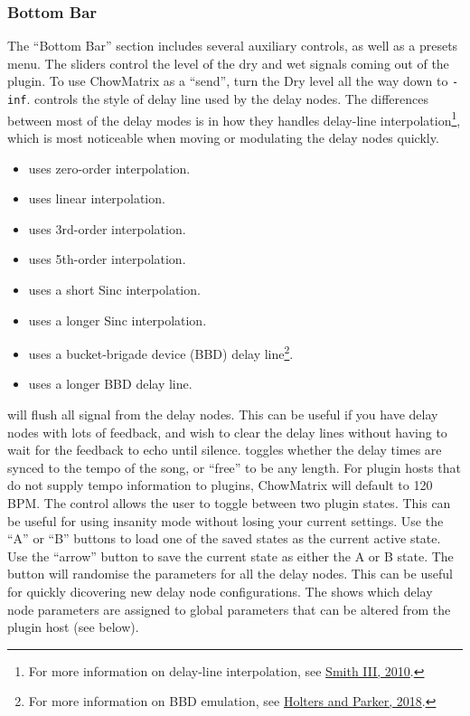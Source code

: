 \documentclass[landscape,twocolumn,a5paper]{manual}
\begin{document}
\subsubsection{Bottom Bar}
The ``Bottom Bar'' section includes several auxiliary controls,
as well as a presets menu.
\newpar
The  sliders control the level of the dry
and wet signals coming out of the plugin. To use ChowMatrix as
a ``send'', turn the Dry level all the way down to \texttt{-inf}.
\newpar
\hypertarget{goto:interp-mode}{} controls
the style of delay line used by the delay nodes. The
differences between most of the delay modes is in how they
handles delay-line interpolation\footnote{For more information on
delay-line interpolation, see \href{https://ccrma.stanford.edu/~jos/pasp/Delay_Line_Signal_Interpolation.html}{Smith III, 2010}.},
which is most noticeable when moving or modulating the delay
nodes quickly.
\vspace{-0.5em}
\begin{itemize}
    \itemsep-1mm
    \item {} uses zero-order interpolation.
    \item {} uses linear interpolation.
    \item {} uses 3rd-order interpolation.
    \item {} uses 5th-order interpolation.
    \item {} uses a short Sinc interpolation.
    \item {} uses a longer Sinc interpolation.
    \item {} uses a bucket-brigade device (BBD)
          delay line\footnote{For more information on BBD emulation, see
          \href{https://www.dafx.de/paper-archive/2018/papers/DAFx2018_paper_12.pdf}{Holters and Parker, 2018}.}.
    \item {} uses a longer BBD delay line.
\end{itemize}
%
 will flush all signal from the delay nodes.
This can be useful if you have delay nodes with lots of feedback,
and wish to clear the delay lines without having to wait for
the feedback to echo until silence.
\newpar
{} toggles whether the delay times are
synced to the tempo of the song, or ``free'' to be any length.
For plugin hosts that do not supply tempo information to plugins,
ChowMatrix will default to 120 BPM.
\newpar
The  control allows the user to toggle
between two plugin states. This can be useful for using
insanity mode without losing your current settings. Use
the ``A'' or ``B'' buttons to load one of the saved states
as the current active state. Use the ``arrow'' button to
save the current state as either the A or B state.
\newpar
The  button will randomise the parameters
for all the delay nodes. This can be useful for quickly
dicovering new delay node configurations.
\newpar
The  shows which delay
node parameters are assigned to global parameters that
can be altered from the plugin host (see below).
\end{document}
